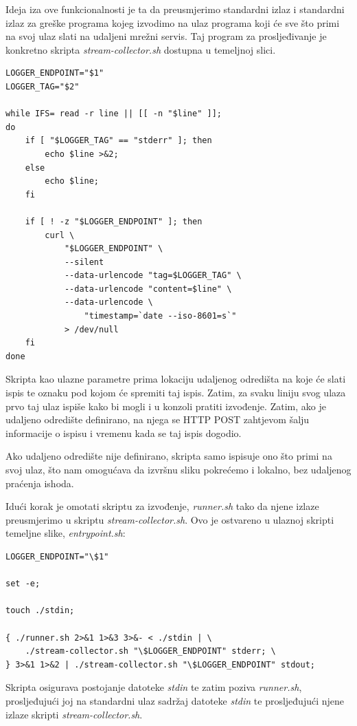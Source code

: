 \documentclass[times, utf8, zavrsni]{fer}
\begin{document}
Ideja iza ove funkcionalnosti je ta da preusmjerimo standardni izlaz i standardni izlaz za greške programa kojeg izvodimo na ulaz programa koji će sve što primi na svoj ulaz slati na udaljeni mrežni servis. Taj program za prosljeđivanje je konkretno skripta {\textit{stream-collector.sh}} dostupna u temeljnoj slici.

\begin{lstlisting}
LOGGER_ENDPOINT="$1"
LOGGER_TAG="$2"

while IFS= read -r line || [[ -n "$line" ]];
do
	if [ "$LOGGER_TAG" == "stderr" ]; then
		echo $line >&2;
	else
		echo $line;
	fi

	if [ ! -z "$LOGGER_ENDPOINT" ]; then
		curl \
			"$LOGGER_ENDPOINT" \
			--silent
			--data-urlencode "tag=$LOGGER_TAG" \
			--data-urlencode "content=$line" \
			--data-urlencode \
				"timestamp=`date --iso-8601=s`"
			> /dev/null
	fi
done
\end{lstlisting}

Skripta kao ulazne parametre prima lokaciju udaljenog odredišta na koje će slati ispis te oznaku pod kojom će spremiti taj ispis. Zatim, za svaku liniju svog ulaza prvo taj ulaz ispiše kako bi mogli i u konzoli pratiti izvođenje. Zatim, ako je udaljeno odredište definirano, na njega se HTTP POST zahtjevom šalju informacije o ispisu i vremenu kada se taj ispis dogodio.

Ako udaljeno odredište nije definirano, skripta samo ispisuje ono što primi na svoj ulaz, što nam omogućava da izvršnu sliku pokrećemo i lokalno, bez udaljenog praćenja ishoda.

Idući korak je omotati skriptu za izvođenje, {\textit{runner.sh}} tako da njene izlaze preusmjerimo u skriptu {\textit{stream-collector.sh}}. Ovo je ostvareno u ulaznoj skripti temeljne slike, {\textit{entrypoint.sh}}:

\begin{lstlisting}
LOGGER_ENDPOINT="\$1"

set -e;

touch ./stdin;

{ ./runner.sh 2>&1 1>&3 3>&- < ./stdin | \
	./stream-collector.sh "\$LOGGER_ENDPOINT" stderr; \
} 3>&1 1>&2 | ./stream-collector.sh "\$LOGGER_ENDPOINT" stdout;
\end{lstlisting}

Skripta osigurava postojanje datoteke {\textit{stdin}} te zatim poziva {\textit{runner.sh}}, prosljeđujući joj na standardni ulaz sadržaj datoteke {\textit{stdin}} te prosljeđujući njene izlaze skripti {\textit{stream-collector.sh}}.
\end{document}
